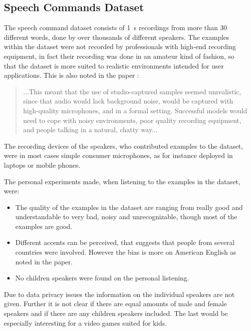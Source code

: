 \subsection{Speech Commands Dataset}\label{sec:exp_dataset_speech_cmd}
The speech command dataset \cite{Warden2018} consists of \SI{1}{\second} recordings from more than 30 different words, done by over thousands of different speakers.
The examples within the dataset were not recorded by professionals with high-end recording equipment, in fact their recording was done in an amateur kind of fashion, so that the dataset is more suited to realistic environments intended for user applications.
This is also noted in the paper \cite{Warden2018}:
\begin{quote}
...This meant that the use of studio-captured samples seemed unrealistic, since that audio would lack background noise, would be captured with high-quality microphones, and in a formal setting. 
Successful models would need to cope with noisy environments, poor quality recording equipment, and people talking in a natural, chatty way...
\end{quote}
The recording devices of the speakers, who contributed examples to the dataset, were in most cases simple consumer microphones, as for instance deployed in laptops or mobile phones.

The personal experiments made, when listening to the examples in the dataset, were:
\begin{itemize}
  \item The quality of the examples in the dataset are ranging from really good and understandable to very bad, noisy and unrecognizable, though most of the examples are good.

  \item Different accents can be perceived, that suggests that people from several countries were involved. However the bias is more on American English as noted in the paper.

  \item No children speakers were found on the personal listening.
\end{itemize}

Due to data privacy issues the information on the individual speakers are not given.
Further it is not clear if there are equal amounts of male and female speakers and if there are any children speakers included.
The last would be especially interesting for a video games suited for kids.

